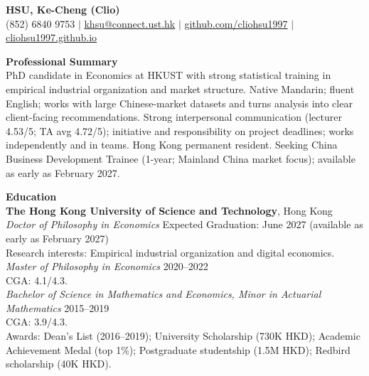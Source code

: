 \documentclass[11pt,letterpaper]{article}
\begin{document}
{\Large \textbf{HSU, Ke-Cheng (Clio)}}\\[1pt]
(852) 6840 9753 \quad $|$ \quad \href{mailto:khsu@connect.ust.hk}{khsu@connect.ust.hk} \quad $|$ \quad \href{https://github.com/cliohsu1997}{github.com/cliohsu1997} \quad $|$ \quad \href{https://cliohsu1997.github.io/}{cliohsu1997.github.io}

\vspace{0.15pt}

{\large \textbf{Professional Summary}}\\[-0.5pt]
PhD candidate in Economics at HKUST with strong statistical training in empirical industrial organization and market structure. Native Mandarin; fluent English; works with large Chinese-market datasets and turns analysis into clear client-facing recommendations. Strong interpersonal communication (lecturer 4.53/5; TA avg 4.72/5); initiative and responsibility on project deadlines; works independently and in teams. Hong Kong permanent resident. Seeking China Business Development Trainee (1-year; Mainland China market focus); available as early as February 2027.

\vspace{0.15pt}

{\large \textbf{Education}}\\[-0.5pt]
\textbf{The Hong Kong University of Science and Technology}, Hong Kong\\
\textit{Doctor of Philosophy in Economics} \hfill Expected Graduation: June 2027 (available as early as February 2027)\\
Research interests: Empirical industrial organization and digital economics.\\
\textit{Master of Philosophy in Economics} \hfill 2020--2022\\
CGA: 4.1/4.3.\\
\textit{Bachelor of Science in Mathematics and Economics, Minor in Actuarial Mathematics} \hfill 2015--2019\\
CGA: 3.9/4.3.\\
Awards: Dean's List (2016--2019); University Scholarship (730K HKD); Academic Achievement Medal (top 1\%); Postgraduate studentship (1.5M HKD); Redbird scholarship (40K HKD).

\vspace{0.15pt}
\end{document}
